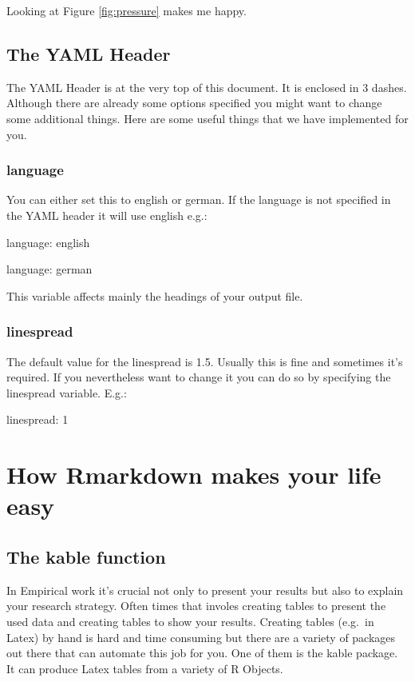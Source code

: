 \documentclass[11pt,]{article}
\begin{document}
Looking at Figure \ref{fig:pressure} makes me happy.

\subsection{The YAML Header}\label{the-yaml-header}

The YAML Header is at the very top of this document. It is enclosed in 3
dashes. Although there are already some options specified you might want
to change some additional things. Here are some useful things that we
have implemented for you.

\subsubsection{language}\label{language}

You can either set this to english or german. If the language is not
specified in the YAML header it will use english e.g.:

language: english

language: german

This variable affects mainly the headings of your output file.

\subsubsection{linespread}\label{linespread}

The default value for the linespread is 1.5. Usually this is fine and
sometimes it's required. If you nevertheless want to change it you can
do so by specifying the linespread variable. E.g.:

linespread: 1

\section{How Rmarkdown makes your life
easy}\label{how-rmarkdown-makes-your-life-easy}

\subsection{The kable function}\label{the-kable-function}

In Empirical work it's crucial not only to present your results but also
to explain your research strategy. Often times that involes creating
tables to present the used data and creating tables to show your
results. Creating tables (e.g.~in Latex) by hand is hard and time
consuming but there are a variety of packages out there that can
automate this job for you. One of them is the kable package. It can
produce Latex tables from a variety of R Objects.
\end{document}
